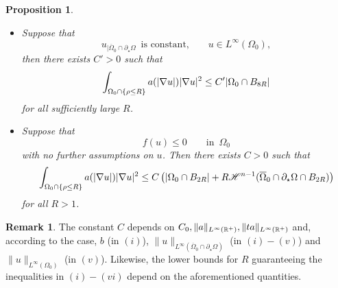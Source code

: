 \documentclass[10 pt,a4paper]{article}
\newtheorem{proposition}[definition]{Proposition}
\theoremstyle{definition}
\newtheorem{remark}[definition]{Remark}
\begin{document}
\begin{proposition}
\begin{itemize}
\[		\]
		then there exists $C>0$ such that
		\begin{equation}
			\int_{\Omega_0\cap\{\rho\leq R\}} \aaa |\nabla u|^2 \leq (C + C_0 R) |\Omega_0\cap B_{8R}|
		\end{equation}
		for all sufficiently large $R$. %
		\item [$(v)$] Suppose that 
		\[
		u_{|\overline{\Omega}_0 \cap\partial_\star\Omega} \, \text{ is constant,}  \qquad u \in L^\infty(\Omega_0), 
		\]
		then there exists $C'>0$ such that
		\begin{equation}
			\int_{\Omega_0\cap\{\rho\leq R\}} a(|\nabla u|) |\nabla u|^2 \leq C' |\Omega_0\cap B_{8R}|
		\end{equation}
		for all sufficiently large $R$. %
		\item [$(vi)$] Suppose that
		\[
			f(u) \leq 0 \qquad \text{in } \, \Omega_0
		\]
		with no further assumptions on $u$. Then there exists $C>0$ such that
		\[
			\int_{\Omega_0\cap\{\rho\leq R\}} a(|\nabla u|) |\nabla u|^2 \leq C \left(|\Omega_0\cap B_{2R}| + R\mathscr{H}^{n-1}(\overline{\Omega}_0 \cap \partial_\star\Omega \cap B_{2R}) \right)
		\]
		for all $R>1$.		
	\end{itemize}
\end{proposition}

\begin{remark}
	The constant $C$ depends on $C_0, \|a\|_{L^\infty(\mathbb R^+)}, \|t a\|_{L^\infty(\mathbb R^+)}$ and, according to the case, $b$ (in $(i)$), $\|u\|_{L^\infty(\overline{\Omega}_0 \cap \partial_\star \Omega)}$ (in $(i)-(v)$) and $\|u\|_{L^\infty(\Omega_0)}$ (in $(v)$). Likewise, the lower bounds for $R$ guaranteeing the inequalities in $(i)-(vi)$ depend on the aforementioned quantities. 
\end{remark}
\end{document}
